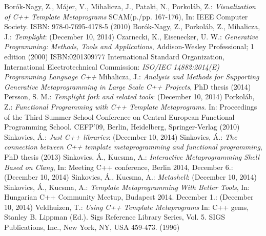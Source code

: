 
\begin{thebibliography}{99}
    Borók-Nagy, Z., Májer, V., Mihalicza, J., Pataki, N., Porkoláb, Z.:
    \textit{Visualization of C++ Template Metaprograms} SCAM(p./pp. 167-176),
    In: IEEE Computer Society. ISBN: 978-0-7695-4178-5 (2010)
    Borók-Nagy, Z., Porkoláb, Z., Mihalicza, J.:
    \textit{Templight}:
     (December 10, 2014)
    Czarnecki, K., Eisenecker, U. W.:
    \textit{Generative Programming: Methods, Tools and Applications},
    Addison-Wesley Professional; 1 edition (2000) ISBN:0201309777
    International Standard Organization, International Electrotechnical
    Commission: \textit{ISO/IEC 14882:2014(E) Programming Language C++}
    Mihalicza, J.:
    \textit{Analysis and Methods for Supporting Generative Metaprogramming in
    Large Scale C++ Projects}, PhD thesis (2014)
    Persson, S. M.:
    \textit{Templight fork and related tools}:
    (December 10, 2014)
    Porkoláb, Z.:
    \textit{Functional Programming with C++ Template Metaprograms}.
    In: Proceedings of the Third Summer School Conference on
    Central European Functional Programming School. CEFP’09, Berlin,
    Heidelberg, Springer-Verlag (2010)
    Sinkovics, Á.:
    \textit{Just C++ libraries}:
     (December 10, 2014)
    Sinkovics, Á.:
    \textit{The connection between C++ template metaprogramming and functional
    programming}, PhD thesis (2013)
    Sinkovics, Á., Kucsma, A.:
    \textit{Interactive Metaprogramming Shell Based on Clang}, In:
    Meeting C++ conference, Berlin 2014, December 6.:
    (December 10, 2014)
    Sinkovics, Á., Kucsma, A.:
    \textit{Metashell}:
     (December 10, 2014)
    Sinkovics, Á., Kucsma, A.:
    \textit{Template Metaprogramming With Better Tools}, In: Hungarian C++
    Community Meetup, Budapest 2014. December 1.:
    (December 10, 2014)
    Veldhuizen, T.:
    \textit{Using C++ Template Metaprograms} In: C++ gems, Stanley B. Lippman
    (Ed.). Sigs Reference Library Series, Vol. 5. SIGS Publications, Inc.,
    New York, NY, USA 459-473. (1996)


\end{thebibliography}
